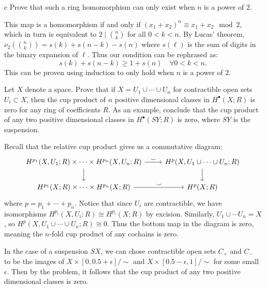 \documentclass[11pt,letterpaper]{article}
\begin{document}
\begin{solution}
    \begin{partproblem}{c}
        Prove that such a ring homomorphism can only exist when $n$ is a power of $2$.
    \end{partproblem}

    \quad This map is a homomorphism if and only if $(x_1+x_2)^n \equiv x_1+x_2\mod 2$, which in turn is equivalent to $2\mid \binom{n}{k}$ for all $0 < k < n$. By Lucas' theorem, $\nu_2\left(\binom{n}{k}\right)=s(k)+s(n-k)-s(n)$ where $s(\ell)$ is the sum of digits in the binary expansion of $\ell$. Thus our condition can be rephrased as:
    \[
        s(k)+s(n-k)\geq 1+s(n)\quad\forall 0<k<n
    .\] 
    This can be proven using induction to only hold when $n$ is a power of $2$.
\end{solution}

\pagebreak
\begin{problem}
    Let $X$ denote a space. Prove that if $X=U_1\cup \cdots\cup U_n$ for contractible open sets $U_i\subset X$, then the cup product of $n$ positive dimensional classes in $H^\bullet(X; R)$ is zero for any ring of coefficients $R$. As an example, conclude that the cup product of any two positive dimensional classes in $H^\bullet(SY; R)$ is zero, where $SY$ is the suspension.
\end{problem}

\quad Recall that the relative cup product gives us a commutative diagram:
\[\begin{tikzcd}
	{H^{p_1}(X,U_1; R)\times\cdots\times H^{p_n}(X,U_n;R)} & {H^p(X,U_1\cup\cdots\cup U_n;R)} \\
	{H^{p_1}(X;R)\times\cdots\times H^{p_n}(X; R)} & {H^p(X;R)}
	\arrow["\smile", from=2-1, to=2-2]
	\arrow["\smile", from=1-1, to=1-2]
	\arrow[from=1-1, to=2-1]
	\arrow[from=1-2, to=2-2]
\end{tikzcd}\]
where $p=p_1+\cdots+p_n$. Notice that since $U_i$ are contractible, we have isomorphisms $H^{p_i}(X, U_i; R) \cong H^{p_i}(X; R)$ by excision. Similarly, $U_1\cup \cdots U_n = X$, so $H^p(X,U_1\cup\cdots\cup U_n;R)\cong 0$. Thus the bottom map in the diagram is zero, meaning the $n$-fold cup product of any cochains is zero.

\quad In the case of a suspension $SX$, we can chose contractible open sets $C_+$ and $C_-$ to be the images of $X\times[0,0.5+\epsilon] / \sim$ and $X\times[0.5-\epsilon, 1] / \sim$ for some small $\epsilon$. Then by the problem, it follows that the cup product of any two positive dimensional classes is zero.  
\end{document}
